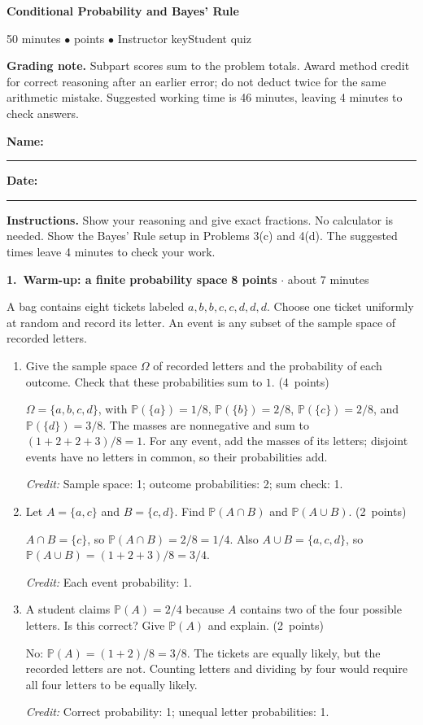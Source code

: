 \documentclass[11pt,letterpaper]{article}
\newcommand{\Prob}{\mathbb P}
\newcommand{\edition}{\ifanswers Instructor key\else Student quiz\fi}
\newcommand{\partpts}[1]{\unskip\nobreak\hspace{.3em}%
  \mbox{\small\color{muted}(#1 points)}}
\newcommand{\credit}[1]{\par{\footnotesize\color{muted}\textit{Credit:} #1}}
\newcommand{\problem}[4]{\par\addvspace{8pt}%
  {\large\bfseries\color{indigo}#1.\ #2}\hfill
  {\small\color{muted}\textbf{#3 points} $\cdot$ about #4 minutes}\par\nobreak}
\begin{document}
{\LARGE\bfseries\color{indigo}Conditional Probability and Bayes' Rule}\par
{\small\color{muted}50 minutes \quad $\bullet$  points
  \quad $\bullet$ \quad \edition}\par
\ifanswers
  \textbf{Grading note.} Subpart scores sum to the problem totals. Award
  method credit for correct reasoning after an earlier error; do not deduct
  twice for the same arithmetic mistake. Suggested working time is 46 minutes,
  leaving 4 minutes to check answers.\par
\else
  \smallskip
  \textbf{Name:}\ \rule{.49\linewidth}{.4pt}\hfill
  \textbf{Date:}\ \rule{.20\linewidth}{.4pt}\par
\fi
\textbf{Instructions.} Show your reasoning and give exact fractions.
No calculator is needed. Show the Bayes' Rule setup in Problems 3(c) and 4(d).
The suggested times leave 4 minutes to check your work.

\problem{1}{Warm-up: a finite probability space}{8}{7}
A bag contains eight tickets labeled
$a,b,b,c,c,d,d,d$. Choose one ticket uniformly at random and record its letter.
An event is any subset of the sample space of recorded letters.
\begin{enumerate}
  \item Give the sample space $\Omega$ of recorded letters and the probability
  of each outcome. Check that these probabilities sum to $1$. \partpts{4}
  \begin{solution}[.6in]
    $\Omega=\{a,b,c,d\}$, with
    $\Prob(\{a\})=1/8$, $\Prob(\{b\})=2/8$,
    $\Prob(\{c\})=2/8$, and $\Prob(\{d\})=3/8$.
    The masses are nonnegative and sum to $(1+2+2+3)/8=1$.
    For any event, add the masses of its letters; disjoint events have no
    letters in common, so their probabilities add.
    \credit{Sample space: 1; outcome probabilities: 2; sum check: 1.}
  \end{solution}

  \item Let $A=\{a,c\}$ and $B=\{c,d\}$. Find
  $\Prob(A\cap B)$ and $\Prob(A\cup B)$. \partpts{2}
  \begin{solution}[.55in]
    $A\cap B=\{c\}$, so $\Prob(A\cap B)=2/8=1/4$.
    Also $A\cup B=\{a,c,d\}$, so $\Prob(A\cup B)=(1+2+3)/8=3/4$.
    \credit{Each event probability: 1.}
  \end{solution}

  \item A student claims $\Prob(A)=2/4$ because $A$ contains two of the four
  possible letters. Is this correct? Give $\Prob(A)$ and explain. \partpts{2}
  \begin{solution}[.55in]
    No: $\Prob(A)=(1+2)/8=3/8$. The tickets are equally likely, but the
    recorded letters are not. Counting letters and dividing by four would
    require all four letters to be equally likely.
    \credit{Correct probability: 1; unequal letter probabilities: 1.}
  \end{solution}
\end{enumerate}
\end{document}
